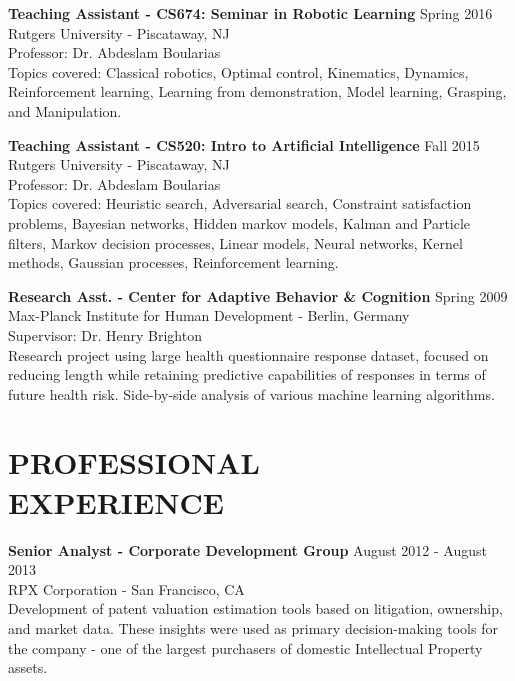 \documentclass[margin, 10pt]{res} %
\begin{document}
\begin{resume}
{\bf Teaching Assistant - CS674: Seminar in Robotic Learning} \hfill Spring 2016 \\
Rutgers University - Piscataway, NJ\\
Professor: Dr. Abdeslam Boularias\\
Topics covered: Classical robotics, Optimal control, Kinematics, Dynamics, Reinforcement learning, Learning from demonstration, Model learning, Grasping, and Manipulation.

{\bf Teaching Assistant - CS520: Intro to Artificial Intelligence} \hfill Fall 2015 \\
Rutgers University - Piscataway, NJ\\
Professor: Dr. Abdeslam Boularias\\
Topics covered: Heuristic search, Adversarial search, Constraint satisfaction problems, Bayesian networks, Hidden markov models, Kalman and Particle filters, Markov decision processes, Linear models, Neural networks, Kernel methods, Gaussian processes, Reinforcement learning.

{\bf Research Asst. - Center for Adaptive Behavior \& Cognition} \hfill Spring 2009 \\
Max-Planck Institute for Human Development - Berlin, Germany\\
Supervisor: Dr. Henry Brighton\\
Research project using large health questionnaire response dataset, focused on reducing length while retaining predictive capabilities of responses in terms of future health risk. Side-by-side analysis of various machine learning algorithms.


\section{PROFESSIONAL \\ EXPERIENCE}

{\bf Senior Analyst - Corporate Development Group} \hfill August 2012 - August 2013 \\
RPX Corporation - San Francisco, CA\\
Development of patent valuation estimation tools based on litigation, ownership, and market data. These insights were used as primary decision-making tools for the company - one of the largest purchasers of domestic Intellectual Property assets.


\end{resume}
\end{document}
